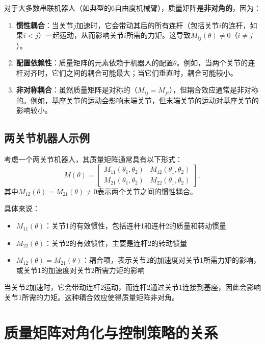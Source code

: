 \documentclass{article}
\begin{document}
对于大多数串联机器人（如典型的6自由度机械臂），质量矩阵是\textbf{非对角的}，因为：

\begin{enumerate}
\item \textbf{惯性耦合}：当关节$j$加速时，它会带动其后的所有连杆（包括关节$i$的连杆，如果$i < j$）一起运动，从而影响关节$i$所需的力矩。这导致$M_{ij}(\theta) \neq 0$（$i \neq j$）。

\item \textbf{配置依赖性}：质量矩阵的元素依赖于机器人的配置$\theta$。例如，当两个关节的连杆对齐时，它们之间的耦合可能最大；当它们垂直时，耦合可能较小。

\item \textbf{非对称耦合}：虽然质量矩阵是对称的（$M_{ij} = M_{ji}$），但耦合效应通常是非对称的。例如，基座关节的运动会影响末端关节，但末端关节的运动对基座关节的影响较小。
\end{enumerate}

\subsection{两关节机器人示例}

考虑一个两关节机器人，其质量矩阵通常具有以下形式：
\begin{equation}
M(\theta) = \begin{bmatrix}
M_{11}(\theta_1, \theta_2) & M_{12}(\theta_1, \theta_2) \\
M_{21}(\theta_1, \theta_2) & M_{22}(\theta_1, \theta_2)
\end{bmatrix},
\end{equation}
其中$M_{12}(\theta) = M_{21}(\theta) \neq 0$表示两个关节之间的惯性耦合。

具体来说：
\begin{itemize}
\item $M_{11}(\theta)$：关节1的有效惯性，包括连杆1和连杆2的质量和转动惯量
\item $M_{22}(\theta)$：关节2的有效惯性，主要是连杆2的转动惯量
\item $M_{12}(\theta) = M_{21}(\theta)$：耦合项，表示关节2的加速度对关节1所需力矩的影响，或关节1的加速度对关节2所需力矩的影响
\end{itemize}

当关节2加速时，它会带动连杆2运动，而连杆2通过关节1连接到基座，因此会影响关节1所需的力矩。这种耦合效应使得质量矩阵非对角。

\section{质量矩阵对角化与控制策略的关系}
\end{document}

